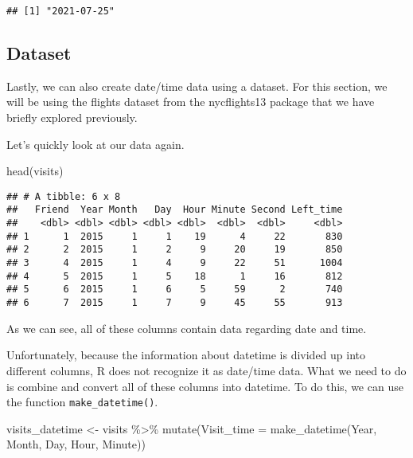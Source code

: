\documentclass[
]{book}
\newenvironment{Shaded}{\begin{snugshade}}{\end{snugshade}}
\newcommand{\AttributeTok}[1]{\textcolor[rgb]{0.77,0.63,0.00}{#1}}
\newcommand{\FunctionTok}[1]{\textcolor[rgb]{0.00,0.00,0.00}{#1}}
\newcommand{\NormalTok}[1]{#1}
\newcommand{\OtherTok}[1]{\textcolor[rgb]{0.56,0.35,0.01}{#1}}
\newcommand{\SpecialCharTok}[1]{\textcolor[rgb]{0.00,0.00,0.00}{#1}}
\begin{document}
\begin{verbatim}
## [1] "2021-07-25"
\end{verbatim}

\hypertarget{dataset}{%
\subsection{Dataset}\label{dataset}}

Lastly, we can also create date/time data using a dataset. For this section, we will be using the flights dataset from the nycflights13 package that we have briefly explored previously.

Let's quickly look at our data again.

\begin{Shaded}
\begin{Highlighting}[]
\FunctionTok{head}\NormalTok{(visits)}
\end{Highlighting}
\end{Shaded}

\begin{verbatim}
## # A tibble: 6 x 8
##   Friend  Year Month   Day  Hour Minute Second Left_time
##    <dbl> <dbl> <dbl> <dbl> <dbl>  <dbl>  <dbl>     <dbl>
## 1      1  2015     1     1    19      4     22       830
## 2      2  2015     1     2     9     20     19       850
## 3      4  2015     1     4     9     22     51      1004
## 4      5  2015     1     5    18      1     16       812
## 5      6  2015     1     6     5     59      2       740
## 6      7  2015     1     7     9     45     55       913
\end{verbatim}

As we can see, all of these columns contain data regarding date and time.

Unfortunately, because the information about datetime is divided up into different columns, R does not recognize it as date/time data. What we need to do is combine and convert all of these columns into datetime. To do this, we can use the function \texttt{make\_datetime()}.

\begin{Shaded}
\begin{Highlighting}[]
\NormalTok{visits\_datetime }\OtherTok{\textless{}{-}}\NormalTok{ visits }\SpecialCharTok{\%\textgreater{}\%}
    \FunctionTok{mutate}\NormalTok{(}\AttributeTok{Visit\_time =} \FunctionTok{make\_datetime}\NormalTok{(Year, Month, Day, Hour, Minute))}
\end{Highlighting}
\end{Shaded}
\end{document}
